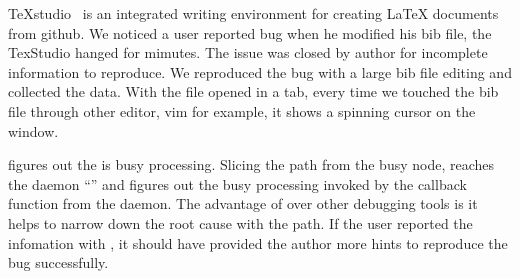 TeXstudio~\cite{texstudio} is an integrated writing environment for creating
LaTeX documents from github. We noticed a user reported bug when he modified his
bib file, the TexStudio hanged for mimutes. The issue was closed by author for
incomplete information to reproduce. We reproduced the bug with a large bib file
editing and collected the data. With the file opened in a tab, every time we
touched the bib file through other editor, vim for example, it shows a spinning
cursor on the window.

\xxx figures out the \spinningnode is busy processing. Slicing the path from the
busy node, \xxx reaches the daemon ``'' and figures out the busy
processing invoked by the callback function from the daemon. The advantage of
\xxx over other debugging tools is it helps to narrow down the root cause with
the path. If the user reported the infomation with \xxx, it should have provided
the author more hints to reproduce the bug successfully.

